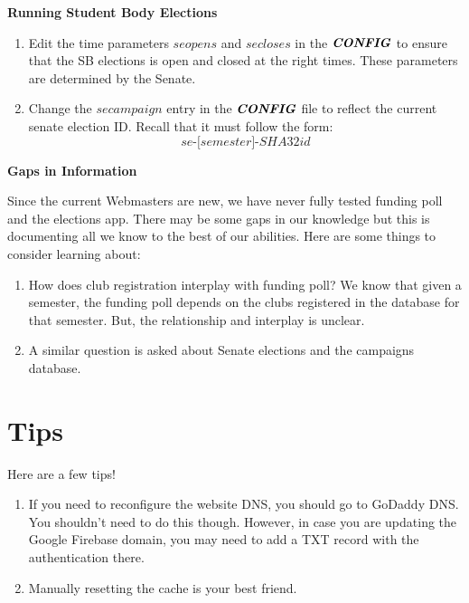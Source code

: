 \documentclass[a4paper]{article}
\begin{document}

\begin{center}
\textbf{Running Student Body Elections}
\end{center}

\begin{enumerate}
  \item Edit the time parameters $\textit{seopens}$ and $\textit{secloses}$ in the $\textbf{\textit{CONFIG}}$ to ensure that the SB elections is open and closed at the right times. These parameters are determined by the Senate.

  \item Change the $\textit{secampaign}$ entry in the $\textbf{\textit{CONFIG}}$ file to reflect the current senate election ID. Recall that it must follow the form:
  $$\textit{se-[semester]-SHA32id}$$
\end{enumerate}

\begin{center}
\textbf{Gaps in Information}
\end{center}

Since the current Webmasters are new, we have never fully tested funding poll and the elections app. There may be some gaps in our knowledge but this is documenting all we know to the best of our abilities. Here are some things to consider learning about:

\begin{enumerate}
  \item How does club registration interplay with funding poll? We know that given a semester, the funding poll depends on the clubs registered in the database for that semester. But, the relationship and interplay is unclear.
  \item A similar question is asked about Senate elections and the campaigns database.
\end{enumerate}

\newpage
\section{Tips}

Here are a few tips!
\begin{enumerate}
  \item If you need to reconfigure the website DNS, you should go to GoDaddy DNS. You shouldn't need to do this though. However, in case you are updating the Google Firebase domain, you may need to add a TXT record with the authentication there.
  \item Manually resetting the cache is your best friend.
\end{enumerate}
\end{document}
